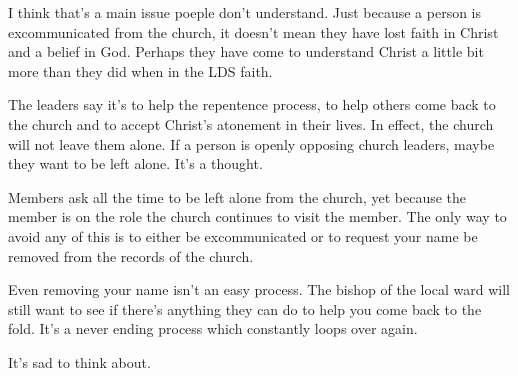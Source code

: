 I think that's a main issue poeple don't understand. Just because a person is
excommunicated from the church, it doesn't mean they have lost faith in Christ and a
belief in God. Perhaps they have come to understand Christ a little bit more than
they did when in the LDS faith.

The leaders say it's to help the repentence process, to help others come back to the
church and to accept Christ's atonement in their lives. In effect, the church will
not leave them alone. If a person is openly opposing church leaders, maybe they want
to be left alone. It's a thought.

Members ask all the time to be left alone from the church, yet because the member is
on the role the church continues to visit the member. The only way to avoid any of
this is to either be excommunicated or to request your name be removed from the
records of the church.

Even removing your name isn't an easy process. The bishop of the local ward will
still want to see if there's anything they can do to help you come back to the fold.
It's a never ending process which constantly loops over again.

It's sad to think about.